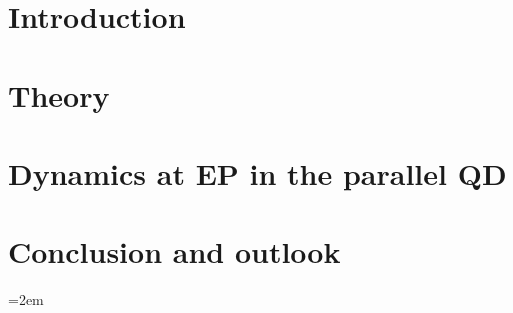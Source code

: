\documentclass[12pt, twoside]{report}
\begin{document}

\newpage
{}

\newpage
{
    \hypersetup{linkcolor=black}
    \tableofcontents
}
\newpage
{}
\chapter{Introduction}

\chapter{Theory}\label{sec:theory}

\chapter{Dynamics at EP in the parallel QD}\label{sec:dyn}


\chapter{Conclusion and outlook}\label{sec:conc}


\newpage
\emergencystretch=2em
\printbibliography
\end{document}
